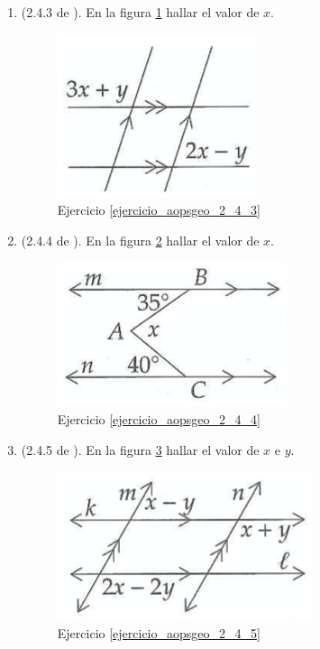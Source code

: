 \begin{enumerate}
	\item  \label{ejercicio_aopsgeo_2_4_3} (2.4.3 de \cite{Aops_Geometria}). En la figura \ref{aopsgeo_2_4_3} hallar el valor de $x$.
	\begin{figure}[H]
		\centering
		\includegraphics[width=0.4\linewidth]{Geometria/imgs/aopsgeo_2_4_3}
		\caption{Ejercicio \ref{ejercicio_aopsgeo_2_4_3}}
		\label{aopsgeo_2_4_3}
	\end{figure}
	
	\item  \label{ejercicio_aopsgeo_2_4_4} (2.4.4 de \cite{Aops_Geometria}). En la figura \ref{aopsgeo_2_4_4} hallar el valor de $x$.
	\begin{figure}[H]
		\centering
		\includegraphics[width=0.4\linewidth]{Geometria/imgs/aopsgeo_2_4_4}
		\caption{Ejercicio \ref{ejercicio_aopsgeo_2_4_4}}
		\label{aopsgeo_2_4_4}
	\end{figure}
	
	\item  \label{ejercicio_aopsgeo_2_4_5} (2.4.5 de \cite{Aops_Geometria}). En la figura \ref{aopsgeo_2_4_5} hallar el valor de $x$ e $y$.
	\begin{figure}[H]
		\centering
		\includegraphics[width=0.4\linewidth]{Geometria/imgs/aopsgeo_2_4_5}
		\caption{Ejercicio \ref{ejercicio_aopsgeo_2_4_5}}
		\label{aopsgeo_2_4_5}
	\end{figure}
	
\end{enumerate}
\newpage	

